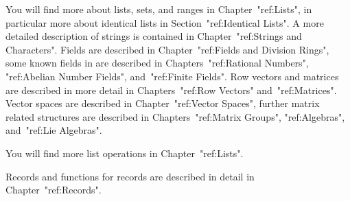 % 
% 
You will find more about lists, sets, and ranges in Chapter~"ref:Lists",
in particular more about identical lists in Section~"ref:Identical Lists".
% 
% 
% 
A more detailed description of strings is contained in
Chapter~"ref:Strings and Characters".
% 
% 
Fields are described in Chapter~"ref:Fields and Division Rings", some
known fields in {\GAP} are described in Chapters~"ref:Rational
Numbers", "ref:Abelian Number Fields", and~"ref:Finite Fields".  Row
vectors and matrices are described in more detail in Chapters~"ref:Row
Vectors" and~"ref:Matrices".  Vector spaces are described in
Chapter~"ref:Vector Spaces", further matrix related structures are
described in Chapters~"ref:Matrix Groups", "ref:Algebras",
and~"ref:Lie Algebras".
% 

% 
You will find more list operations in Chapter~"ref:Lists".

Records and functions for records are described in detail
in Chapter~"ref:Records".


